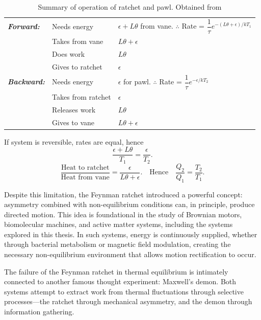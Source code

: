 \begin{table}[ht]
\centering
\renewcommand{\arraystretch}{1.4}
\caption[Summary of operation of ratchet and pawl.]{Summary of operation of ratchet and pawl. Obtained from \cite{feynman1963feynman}}
\label{tab:ratchet_pawl}
\begin{tabular}{>{\itshape}l l l}
\toprule
\textbf{Forward:} & Needs energy & $\epsilon + L \theta$ from vane. \quad $\therefore$ Rate = $\dfrac{1}{\tau} e^{-(L\theta + \epsilon)/kT_1}$ \\
                  & Takes from vane & $L\theta + \epsilon$ \\
                  & Does work & $L\theta$ \\
                  & Gives to ratchet & $\epsilon$ \\
\midrule
\textbf{Backward:} & Needs energy & $\epsilon$ for pawl. \quad $\therefore$ Rate = $\dfrac{1}{\tau} e^{-\epsilon/kT_2}$ \\
                   & Takes from ratchet & $\epsilon$ \\
                   & Releases work & $L\theta$ \\
                   & Gives to vane & $L\theta + \epsilon$ \\
\bottomrule
\end{tabular}

\vspace{1em}
If system is reversible, rates are equal, hence 
\[
\frac{\epsilon + L\theta}{T_1} = \frac{\epsilon}{T_2}.
\]
\[
\frac{\text{Heat to ratchet}}{\text{Heat from vane}} = \frac{\epsilon}{L\theta + \epsilon}.
\quad \text{Hence} \quad \frac{Q_2}{Q_1} = \frac{T_2}{T_1}.
\]
\end{table}

Despite this limitation, the Feynman ratchet introduced a powerful concept: asymmetry combined with non-equilibrium conditions can, in principle, produce directed motion. This idea is foundational in the study of Brownian motors, biomolecular machines, and active matter systems, including the systems explored in this thesis. In such systems, energy is continuously supplied, whether through bacterial metabolism or magnetic field modulation, creating the necessary non-equilibrium environment that allows motion rectification to occur.

The failure of the Feynman ratchet in thermal equilibrium is intimately connected to another famous thought experiment: Maxwell's demon. Both systems attempt to extract work from thermal fluctuations through selective processes—the ratchet through mechanical asymmetry, and the demon through information gathering.

